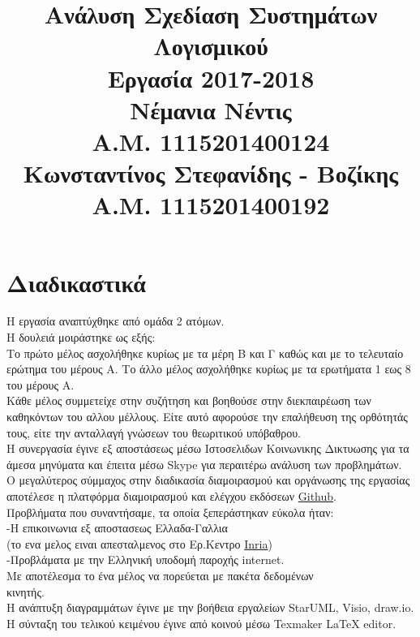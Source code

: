 \documentclass[12pt]{article}
\title{{Ανάλυση Σχεδίαση Συστημάτων Λογισμικού} \\
\vspace{2cm}
{\Huge Εργασία 2017-2018} \\
\vspace{2cm}
{Νέμανια Νέντις}\\
{Α.Μ. 1115201400124}\\
{Κωνσταντίνος Στεφανίδης - Βοζίκης}\\
{Α.Μ. 1115201400192}}
\date{}
\newcommand\tab[1][1cm]{\hspace*{#1}}
\begin{document}
\maketitle
\newpage
\tableofcontents
\newpage

\section{Διαδικαστικά}
Η εργασία αναπτύχθηκε από ομάδα 2 ατόμων.\\
\tab Η δουλειά μοιράστηκε ως εξής:\\ 
\tab Το πρώτο μέλος ασχολήθηκε κυρίως με τα μέρη Β και Γ καθώς και με το τελευταίο ερώτημα του μέρους Α. Το άλλο μέλος ασχολήθηκε κυρίως με τα ερωτήματα 1 εως 8 
του μέρους Α.\\
\tab Κάθε μέλος συμμετείχε στην συζήτηση και βοηθούσε στην διεκπαιρέωση των καθηκόντων του αλλου μέλλους. Είτε αυτό αφορούσε την επαλήθευση της ορθότητάς τους, είτε την ανταλλαγή γνώσεων του θεωριτικού υπόβαθρου.\\
\tab Η συνεργασία έγινε εξ αποστάσεως μέσω Ιστοσελιδων Κοινωνικης Δικτυωσης για τα άμεσα μηνύματα και έπειτα μέσω \textlatin{Skype} για περαιτέρω ανάλυση των προβλημάτων.\\
\tab Ο μεγαλύτερος σύμμαχος στην διαδικασία διαμοιρασμού και οργάνωσης της εργασίας αποτέλεσε η πλατφόρμα διαμοιρασμού και ελέγχου εκδόσεων \href{https://github.com/}{\textlatin{Github}}.\\
\tab Προβλήματα που συναντήσαμε, τα οποία ξεπεράστηκαν εύκολα ήταν:\\
\tab\tab -Η επικοινωνια εξ αποστασεως Ελλαδα-Γαλλια\\
\tab\tab (το ενα μελος ειναι απεσταλμενος στο Ερ.Κεντρο \href{https://www.inria.fr/en/}{\textlatin{Inria}})\\
\tab\tab -Προβλάματα με την Ελληνική υποδομή παροχής \textlatin{internet}.\\
\tab\tab Με αποτέλεσμα το ένα μέλος να πορεύεται με πακέτα δεδομένων\\ \tab\tab κινητής.\\
\tab Η ανάπτυξη διαγραμμάτων έγινε με την βοήθεια εργαλείων \textlatin{StarUML, Visio, draw.io}.\\
\tab Η σύνταξη του τελικού κειμένου έγινε από κοινού μέσω \textlatin{Texmaker LaTeX editor}.


\newpage
\end{document}
